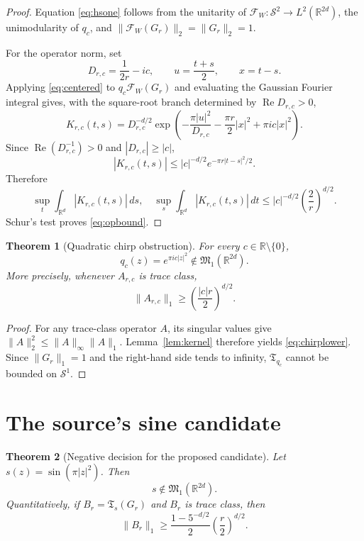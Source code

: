 \documentclass[11pt]{article}
\newtheorem{theorem}{Theorem}
\newcommand{\R}{\mathbb R}
\newcommand{\Schat}{\mathcal S}
\newcommand{\FW}{\mathcal F_W}
\newcommand{\Tm}{\mathfrak T}
\newcommand{\Mm}{\mathfrak M}
\begin{document}
\begin{proof}
Equation \eqref{eq:hsone} follows from the unitarity of $\FW:\Schat^2\to
L^2(\R^{2d})$, the unimodularity of $q_c$, and
$\|\FW(G_r)\|_2=\|G_r\|_2=1$.

For the operator norm, set
\[
    D_{r,c}=\frac1{2r}-ic,\qquad
    u=\frac{t+s}{2},\qquad x=t-s.
\]
Applying \eqref{eq:centered} to $q_c\FW(G_r)$ and evaluating the Gaussian
Fourier integral gives, with the square-root branch determined by
$\operatorname{Re}D_{r,c}>0$,
\begin{equation}\label{eq:kernel}
 K_{r,c}(t,s)=D_{r,c}^{-d/2}
 \exp\left(-\frac{\pi|u|^2}{D_{r,c}}
           -\frac{\pi r}{2}|x|^2+\pi ic|x|^2\right).
\end{equation}
Since $\operatorname{Re}(D_{r,c}^{-1})>0$ and
$|D_{r,c}|\ge|c|$,
\[
 |K_{r,c}(t,s)|
 \le |c|^{-d/2}e^{-\pi r|t-s|^2/2}.
\]
Therefore
\[
 \sup_t\int_{\R^d}|K_{r,c}(t,s)|\,ds,
 \quad
 \sup_s\int_{\R^d}|K_{r,c}(t,s)|\,dt
 \le |c|^{-d/2}\left(\frac2r\right)^{d/2}.
\]
Schur's test proves \eqref{eq:opbound}.
\end{proof}

\begin{theorem}[Quadratic chirp obstruction]\label{thm:chirp}
For every $c\in\R\setminus\{0\}$,
\[
        q_c(z)=e^{\pi ic|z|^2}\notin\Mm_1(\R^{2d}).
\]
More precisely, whenever $A_{r,c}$ is trace class,
\begin{equation}\label{eq:chirplower}
 \|A_{r,c}\|_1\ge
       \left(\frac{|c|r}{2}\right)^{d/2}.
\end{equation}
\end{theorem}

\begin{proof}
For any trace-class operator $A$, its singular values give
$\|A\|_2^2\le\|A\|_\infty\|A\|_1$.  Lemma~\ref{lem:kernel} therefore yields
\eqref{eq:chirplower}.  Since $\|G_r\|_1=1$ and the right-hand side tends to
infinity, $\Tm_{q_c}$ cannot be bounded on $\Schat^1$.
\end{proof}

\section{The source's sine candidate}

\begin{theorem}[Negative decision for the proposed candidate]\label{thm:sine}
Let $s(z)=\sin(\pi|z|^2)$.  Then
\[
                   \boxed{s\notin\Mm_1(\R^{2d}).}
\]
Quantitatively, if $B_r=\Tm_s(G_r)$ and $B_r$ is trace class, then
\begin{equation}\label{eq:sinelower}
 \|B_r\|_1\ge
 \frac{1-5^{-d/2}}2\left(\frac r2\right)^{d/2}.
\end{equation}
\end{theorem}
\end{document}
